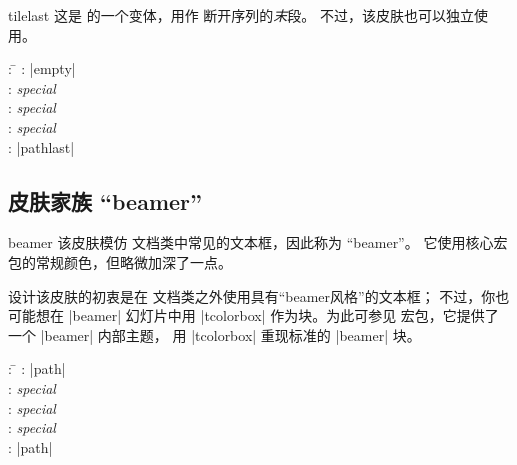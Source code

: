 \begin{dispExample}
\end{dispExample}


\clearpage
\begin{docSkin}[doc new=2016-02-25]{tilelast}
这是  的一个变体，用作  断开序列的\emph{末}段。
不过，该皮肤也可以独立使用。
\begin{tcolorbox}[skintable=tilelast]
  \begin{tabbing}
    : \=\kill
    :           \> |empty|\\
    : \> \emph{special}\\ 
    :        \> \emph{special}\\
    :    \> \emph{special}\\
    :           \> |pathlast|
  \end{tabbing}
\end{tcolorbox}
\end{docSkin}


\begin{dispExample}
\end{dispExample}



\clearpage
\subsection{皮肤家族 \enquote{beamer}}

\begin{docSkin}{beamer}
  该皮肤模仿  文档类中常见的文本框，因此称为 \enquote{beamer}。
  它使用核心宏包的常规颜色，但略微加深了一点。\par
  设计该皮肤的初衷是在  文档类之外使用具有\enquote{beamer风格}的文本框；
  不过，你也可能想在 |beamer| 幻灯片中用 |tcolorbox| 作为块。为此可参见
   宏包，它提供了一个 |beamer| 内部主题，
  用 |tcolorbox| 重现标准的 |beamer| 块。
\begin{tcolorbox}[skintable=beamer]
  \begin{tabbing}
    : \=\kill
    :           \> |path|\\
    : \> \emph{special}\\ 
    :        \> \emph{special}\\
    :    \> \emph{special}\\
    :           \> |path|
  \end{tabbing}
\end{tcolorbox}
\end{docSkin}



